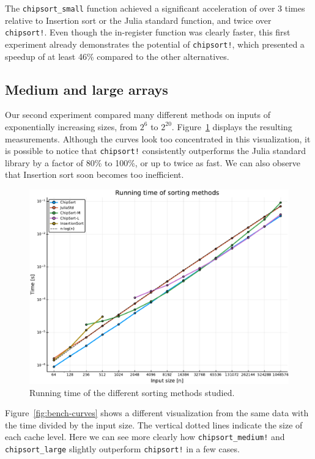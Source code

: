 \documentclass{juliacon}
\begin{document}
The {\tt chipsort\_small} function achieved a significant acceleration of over 3 times relative to Insertion sort or the Julia standard function, and twice over {\tt chipsort!}. Even though the in-register function was clearly faster, this first experiment already demonstrates the potential of {\tt chipsort!}, which presented a speedup of at least 46\% compared to the other alternatives.

\subsection{Medium and large arrays}
Our second experiment compared many different methods on inputs of exponentially increasing sizes, from $2^6$ to $2^{20}$. Figure~\ref{fig:bench-time} displays the resulting measurements. Although the curves look too concentrated in this visualization, it is possible to notice that {\tt chipsort!} consistently outperforms the Julia standard library by a factor of 80\% to 100\%, or up to twice as fast. We can also observe that Insertion sort soon becomes too inefficient.

\begin{figure}[htb]
\centerline{\includegraphics[width=\linewidth]{fig/chipsort-bench-time.pdf}}
\caption{Running time of the different sorting methods studied.}
\label{fig:bench-time}
\end{figure}

Figure~\ref{fig:bench-curves} shows a different visualization from the same data with the time divided by the input size. The vertical dotted lines indicate the size of each cache level. Here we can see more clearly how {\tt chipsort\_medium!} and {\tt chipsort\_large} slightly outperform {\tt chipsort!} in a few cases.
\end{document}
